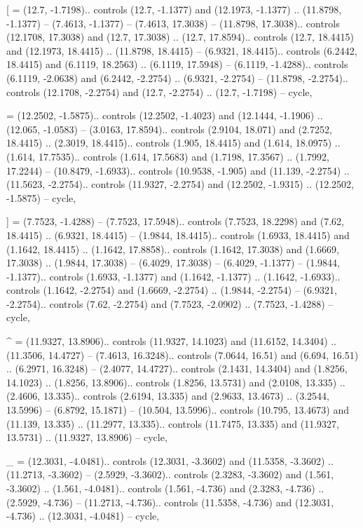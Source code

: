 [ = {(12.7, -1.7198).. controls (12.7, -1.1377) and (12.1973, -1.1377) .. (11.8798, -1.1377) -- (7.4613, -1.1377) -- (7.4613, 17.3038) -- (11.8798, 17.3038).. controls (12.1708, 17.3038) and (12.7, 17.3038) .. (12.7, 17.8594).. controls (12.7, 18.4415) and (12.1973, 18.4415) .. (11.8798, 18.4415) -- (6.9321, 18.4415).. controls (6.2442, 18.4415) and (6.1119, 18.2563) .. (6.1119, 17.5948) -- (6.1119, -1.4288).. controls (6.1119, -2.0638) and (6.2442, -2.2754) .. (6.9321, -2.2754) -- (11.8798, -2.2754).. controls (12.1708, -2.2754) and (12.7, -2.2754) .. (12.7, -1.7198) -- cycle},

\ctpbackslash = {(12.2502, -1.5875).. controls (12.2502, -1.4023) and (12.1444, -1.1906) .. (12.065, -1.0583) -- (3.0163, 17.8594).. controls (2.9104, 18.071) and (2.7252, 18.4415) .. (2.3019, 18.4415).. controls (1.905, 18.4415) and (1.614, 18.0975) .. (1.614, 17.7535).. controls (1.614, 17.5683) and (1.7198, 17.3567) .. (1.7992, 17.2244) -- (10.8479, -1.6933).. controls (10.9538, -1.905) and (11.139, -2.2754) .. (11.5623, -2.2754).. controls (11.9327, -2.2754) and (12.2502, -1.9315) .. (12.2502, -1.5875) -- cycle},

] = {(7.7523, -1.4288) -- (7.7523, 17.5948).. controls (7.7523, 18.2298) and (7.62, 18.4415) .. (6.9321, 18.4415) -- (1.9844, 18.4415).. controls (1.6933, 18.4415) and (1.1642, 18.4415) .. (1.1642, 17.8858).. controls (1.1642, 17.3038) and (1.6669, 17.3038) .. (1.9844, 17.3038) -- (6.4029, 17.3038) -- (6.4029, -1.1377) -- (1.9844, -1.1377).. controls (1.6933, -1.1377) and (1.1642, -1.1377) .. (1.1642, -1.6933).. controls (1.1642, -2.2754) and (1.6669, -2.2754) .. (1.9844, -2.2754) -- (6.9321, -2.2754).. controls (7.62, -2.2754) and (7.7523, -2.0902) .. (7.7523, -1.4288) -- cycle},

^ = {(11.9327, 13.8906).. controls (11.9327, 14.1023) and (11.6152, 14.3404) .. (11.3506, 14.4727) -- (7.4613, 16.3248).. controls (7.0644, 16.51) and (6.694, 16.51) .. (6.2971, 16.3248) -- (2.4077, 14.4727).. controls (2.1431, 14.3404) and (1.8256, 14.1023) .. (1.8256, 13.8906).. controls (1.8256, 13.5731) and (2.0108, 13.335) .. (2.4606, 13.335).. controls (2.6194, 13.335) and (2.9633, 13.4673) .. (3.2544, 13.5996) -- (6.8792, 15.1871) -- (10.504, 13.5996).. controls (10.795, 13.4673) and (11.139, 13.335) .. (11.2977, 13.335).. controls (11.7475, 13.335) and (11.9327, 13.5731) .. (11.9327, 13.8906) -- cycle},

_ = {(12.3031, -4.0481).. controls (12.3031, -3.3602) and (11.5358, -3.3602) .. (11.2713, -3.3602) -- (2.5929, -3.3602).. controls (2.3283, -3.3602) and (1.561, -3.3602) .. (1.561, -4.0481).. controls (1.561, -4.736) and (2.3283, -4.736) .. (2.5929, -4.736) -- (11.2713, -4.736).. controls (11.5358, -4.736) and (12.3031, -4.736) .. (12.3031, -4.0481) -- cycle},


